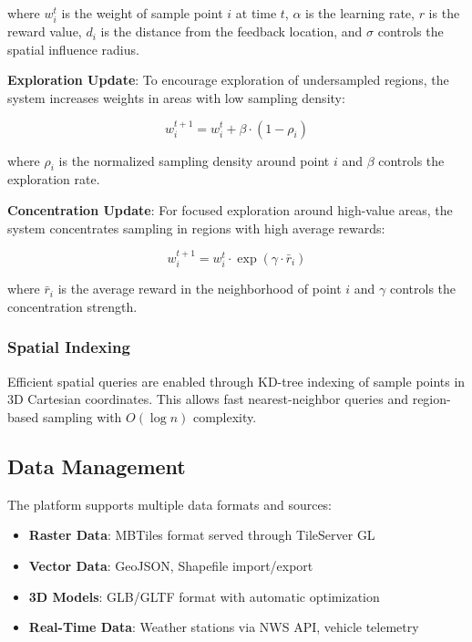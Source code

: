 \documentclass[conference]{IEEEtran}
\begin{document}
where $w_i^t$ is the weight of sample point $i$ at time $t$, $\alpha$ is the learning rate, $r$ is the reward value, $d_i$ is the distance from the feedback location, and $\sigma$ controls the spatial influence radius.

\textbf{Exploration Update}: To encourage exploration of undersampled regions, the system increases weights in areas with low sampling density:

\begin{equation}
w_i^{t+1} = w_i^t + \beta \cdot (1 - \rho_i)
\end{equation}

where $\rho_i$ is the normalized sampling density around point $i$ and $\beta$ controls the exploration rate.

\textbf{Concentration Update}: For focused exploration around high-value areas, the system concentrates sampling in regions with high average rewards:

\begin{equation}
w_i^{t+1} = w_i^t \cdot \exp\left(\gamma \cdot \bar{r}_i\right)
\end{equation}

where $\bar{r}_i$ is the average reward in the neighborhood of point $i$ and $\gamma$ controls the concentration strength.

\subsubsection{Spatial Indexing}

Efficient spatial queries are enabled through KD-tree indexing of sample points in 3D Cartesian coordinates. This allows fast nearest-neighbor queries and region-based sampling with $O(\log n)$ complexity.

\subsection{Data Management}

The platform supports multiple data formats and sources:

\begin{itemize}
    \item \textbf{Raster Data}: MBTiles format served through TileServer GL
    \item \textbf{Vector Data}: GeoJSON, Shapefile import/export
    \item \textbf{3D Models}: GLB/GLTF format with automatic optimization
    \item \textbf{Real-Time Data}: Weather stations via NWS API, vehicle telemetry
\end{itemize}
\end{document}
